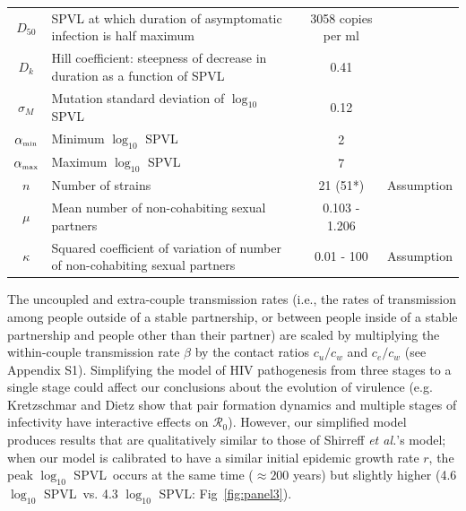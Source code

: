 \documentclass[10pt,letterpaper]{article}
\renewcommand{\figurename}{Fig}
\newcommand{\Lspvl}{$\log_{10}$ SPVL}
\newcommand{\rzero}{{\mathcal R}_0}
\newcommand{\etal}{\textit{et al.}}
\newcommand{\tsub}[2]{#1_{{\textrm{\tiny #2}}}}
\begin{document}
\begin{table}[h!]
\begin{tabular}{c p{2in} c l}
$D_{50}$ & SPVL at which duration of asymptomatic infection is half maximum & 3058 copies per ml & \cite{shirreff_transmission_2011} \\
$D_{k}$ & Hill coefficient: steepness of decrease in duration as a function of SPVL & 0.41 & \cite{shirreff_transmission_2011} \\
$\sigma_M$ & Mutation standard deviation of $\log_{10}$ SPVL & 0.12 & \cite{shirreff_transmission_2011} \\
$\tsub{\alpha}{min}$ & Minimum $\log_{10}$ SPVL & 2 & \cite{shirreff_transmission_2011}\\
$\tsub{\alpha}{max}$ & Maximum $\log_{10}$ SPVL & 7 & \cite{shirreff_transmission_2011}\\
$n$ & Number of strains & 21 (51*) & Assumption\\
$\mu$ & Mean number of non-cohabiting sexual partners & 0.103 - 1.206 & \cite{omori2015dynamics}\\
$\kappa$ & Squared coefficient of variation of number of non-cohabiting sexual partners & 0.01 - 100 & Assumption\\
\hline
\end{tabular}
\label{table:parmsTable}
\end{table}

The uncoupled and extra-couple transmission rates (i.e., the rates of
transmission among people outside of a stable partnership, or between
people inside of a stable partnership and people other than their
partner) are scaled by
multiplying the within-couple transmission rate $\beta$ by the contact
ratios $c_u/c_w$ and $c_e/c_w$ (see Appendix S1). Simplifying the model
of HIV pathogenesis from three stages to a single stage could affect
our conclusions about the evolution of virulence (e.g. Kretzschmar and
Dietz \cite{kretzschmar_effect_1998} show that pair formation dynamics
and multiple stages of infectivity have interactive effects on
$\rzero$). However, our simplified model produces results that are
qualitatively similar to those of Shirreff \etal's
\cite{shirreff_transmission_2011} model; when our model is calibrated
to have a similar initial epidemic growth rate $r$, the peak
\Lspvl\ occurs at the same time ($\approx 200$ years) but slightly
higher (4.6 \Lspvl\ vs. 4.3 \Lspvl: \figurename~\ref{fig:panel3}).
\end{document}
